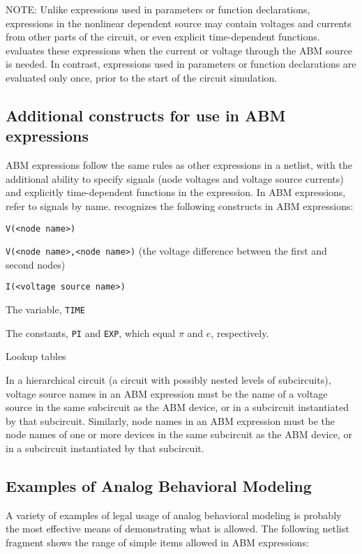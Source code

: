 NOTE: Unlike expressions used in parameters or function declarations,
expressions in the nonlinear dependent source may contain voltages and
currents from other parts of the circuit, or even explicit
time-dependent functions.  \Xyce{} evaluates these expressions when the
current or voltage through the ABM source is needed.  In contrast, expressions
used in parameters or function declarations are evaluated only once, prior
to the start of the circuit simulation.

\subsection{Additional constructs for use in ABM expressions}

ABM expressions follow the same rules as other expressions in a
netlist, with the additional ability to specify signals (node voltages
and voltage source currents) and explicitly time-dependent functions
in the expression.  In ABM expressions, refer to signals by
name. \Xyce{} recognizes the following constructs in ABM expressions:
\begin{XyceItemize}
\item \texttt{V(<node name>)}
\item \texttt{V(<node name>,<node name>)} (the voltage difference between the first and second nodes)
\item \texttt{I(<voltage source name>)}
\item The variable, \texttt{TIME}
\item The constants, \texttt{PI} and \texttt{EXP}, which equal $\pi$ and $e$, respectively.
\item Lookup tables
\end{XyceItemize}

In a hierarchical circuit (a circuit with possibly nested levels of
subcircuits), voltage source names in an ABM expression must be the
name of a voltage source in the same subcircuit as the ABM device, or in a
subcircuit instantiated by that subcircuit.  Similarly, node names in an ABM 
expression must be the node names of one or more devices in the same subcircuit
as the ABM device, or in a subcircuit instantiated by that subcircuit. 

\subsection{Examples of Analog Behavioral Modeling}
A variety of examples of legal usage of analog behavioral modeling is
probably the most effective means of demonstrating what is
allowed. The following netlist fragment shows the range of 
simple items allowed in ABM  expressions:

